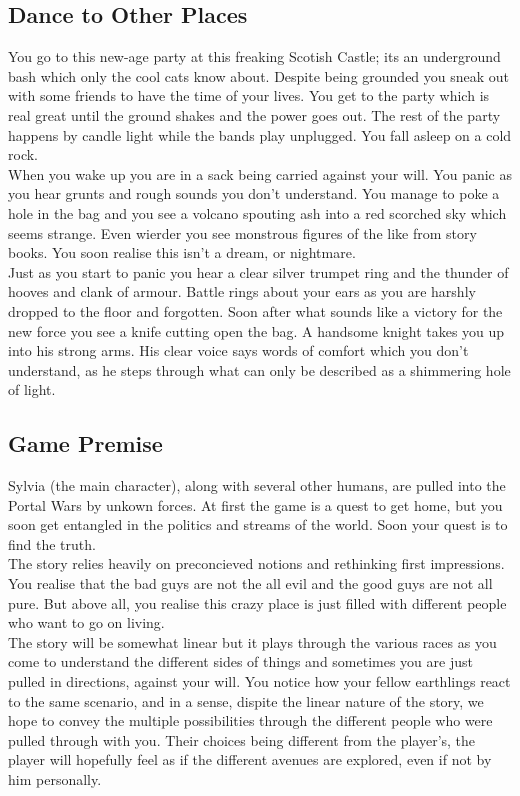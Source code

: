 \documentclass[a4paper,twocolumn]{article}
\begin{document}
\subsection{Dance to Other Places}

You go to this new-age party at this freaking Scotish Castle; its an underground bash which only the cool cats know about. Despite being grounded you sneak out with some friends to have the time of your lives. You get to the party which is real great until the ground shakes and the power goes out. The rest of the party happens by candle light while the bands play unplugged. You fall asleep on a cold rock.\\
When you wake up you are in a sack being carried against your will. You panic as you hear grunts and rough sounds you don't understand. You manage to poke a hole in the bag and you see a volcano spouting ash into a red scorched sky which seems strange. Even wierder you see monstrous figures of the like from story books. You soon realise this isn't a dream, or nightmare.\\
Just as you start to panic you hear a clear silver trumpet ring and the thunder of hooves and clank of armour. Battle rings about your ears as you are harshly dropped to the floor and forgotten. Soon after what sounds like a victory for the new force you see a knife cutting open the bag. A handsome knight takes you up into his strong arms. His clear voice says words of comfort which you don't understand, as he steps through what can only be described as a shimmering hole of light.

\subsection{Game Premise}

Sylvia (the main character), along with several other humans, are pulled into the Portal Wars by unkown forces. At first the game is a quest to get home, but you soon get entangled in the politics and streams of the world. Soon your quest is to find the truth.\\
The story relies heavily on preconcieved notions and rethinking first impressions. You realise that the bad guys are not the all evil and the good guys are not all pure. But above all, you realise this crazy place is just filled with different people who want to go on living.\\

The story will be somewhat linear but it plays through the various races as you come to understand the different sides of things and sometimes you are just pulled in directions, against your will. You notice how your fellow earthlings react to the same scenario, and in a sense, dispite the linear nature of the story, we hope to convey the multiple possibilities through the different people who were pulled through with you. Their choices being different from the player's, the player will hopefully feel as if the different avenues are explored, even if not by him personally.\\
\end{document}
